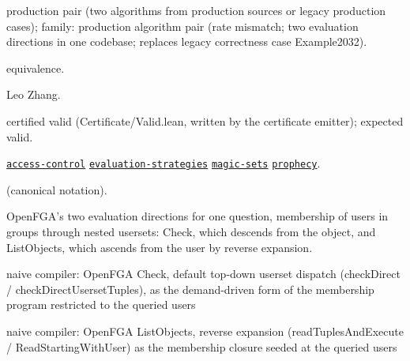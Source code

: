 \documentclass[10pt]{article}
\begin{document}
\begin{description}[leftmargin=2.6cm,style=nextline,itemsep=1pt]

\item[Category] production pair (two algorithms from production sources or legacy production cases); family: production algorithm pair (rate mismatch; two evaluation directions in one codebase; replaces legacy correctness case Example2032).

\item[Kind] equivalence.

\item[Contributors] Leo Zhang.

\item[Status] certified valid (Certificate/Valid.lean, written by the certificate emitter); expected valid.

\item[Tags] \hyperref[tag:access-control]{\texttt{access-control}} \hyperref[tag:evaluation-strategies]{\texttt{evaluation-strategies}} \hyperref[tag:magic-sets]{\texttt{magic-sets}} \hyperref[tag:prophecy]{\texttt{prophecy}}.

\item[Input]  (canonical notation).

\item[Summary] OpenFGA's two evaluation directions for one question, membership of users in groups through nested usersets: Check, which descends from the object, and ListObjects, which ascends from the user by reverse expansion.

\item[Sides] naive compiler: OpenFGA Check, default top-down userset dispatch (checkDirect / checkDirectUsersetTuples), as the demand-driven form of the membership program restricted to the queried users \par naive compiler: OpenFGA ListObjects, reverse expansion (readTuplesAndExecute / ReadStartingWithUser) as the membership closure seeded at the queried users


\end{description}
\end{document}
